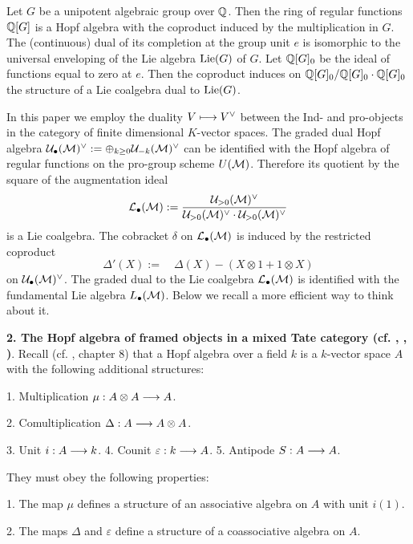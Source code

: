 \documentclass[10pt]{article}
\begin{document}
 Let $G$ be a 
unipotent algebraic group over ${\mathbb Q}$. Then the ring of regular functions 
${\mathbb Q}[G]$ is a Hopf algebra with the coproduct induced by the multiplication in $G$.
The (continuous) dual of its completion at the group unit $e$ is isomorphic 
to the universal enveloping 
of the Lie algebra ${\rm Lie}(G)$ of $G$. Let ${\mathbb Q}[G]_0$ be the ideal of functions
equal to
zero at $e$. Then the coproduct induces on ${\mathbb Q}[G]_0/{\mathbb Q}[G]_0 \cdot {\mathbb Q}[G]_0$ the 
structure of a Lie coalgebra  dual to ${\rm Lie}(G)$.


In this paper we employ the duality $V \longmapsto V^{\vee}$ between the Ind- and pro-objects 
in the category of finite dimensional $K$-vector spaces. The graded dual Hopf algebra ${\cal U}_{\bullet}({\cal M})^{\vee}:= 
\oplus_{k \geq 0} {\cal U}_{-k}({\cal M})^{\vee}$ can be identified with the Hopf algebra  
of regular functions on the pro-group scheme $U({\cal M})$. 
Therefore its  quotient by the square of the augmentation ideal 
$$
{\cal L}_{\bullet}({\cal M}):= \frac{{\cal U}_{>0}({\cal M})^{\vee}}
{{\cal U}_{>0}({\cal M})^{\vee} \cdot {\cal U}_{>0}({\cal M})^{\vee}}
$$
is a Lie coalgebra. 
The cobracket $\delta$ on ${\cal L}_{\bullet}({\cal M})$ 
is induced by the restricted coproduct 
\begin{equation} \label{8-23.2/99}
 \Delta'(X):= \quad \Delta (X)-  (X \otimes 1 + 1 \otimes X)
\end{equation}
on ${\cal U}_{\bullet}({\cal M})^{\vee}$. 
The  graded dual to the Lie coalgebra ${\cal L}_{\bullet}({\cal M})$ 
is identified with the fundamental Lie algebra 
$L_{\bullet}({\cal M})$. Below we  recall a more efficient 
  way to think about  it. 

 {\bf 2. The Hopf algebra of framed objects in a mixed Tate category 
(cf. \cite{BMS}, \cite{BGSV}, \cite{G9})}. Recall (cf. \cite{ES}, chapter 8) that 
a Hopf algebra over a field $k$ is a $k$-vector space $A$ with 
the following additional structures:

1. Multiplication $\mu: A \otimes A \longrightarrow A$.

2. Comultiplication $\Delta: A \longrightarrow A \otimes  A$.

3. Unit $i:A \longrightarrow k$. 4. Counit $\varepsilon: k \longrightarrow A$. 5. Antipode $S: A \longrightarrow A$.

They must obey the following properties:

1. The map $\mu$ defines a structure of an associative algebra on $A$ with unit $i(1)$.

2. The maps $\Delta$ and $\varepsilon$ define 
a structure of a coassociative algebra on $A$.
\end{document}
